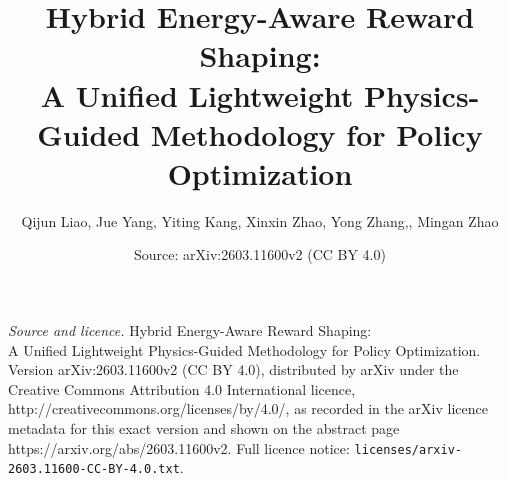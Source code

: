 \documentclass[10pt,a4paper]{amsart}
\title{Hybrid Energy-Aware Reward Shaping:\\A Unified Lightweight Physics-Guided Methodology for Policy Optimization}
\author{Qijun Liao, Jue Yang, Yiting Kang, Xinxin Zhao, Yong Zhang,, Mingan Zhao}
\date{Source: arXiv:2603.11600v2 (CC BY 4.0)}
\begin{document}
\maketitle

\noindent\emph{Source and licence.} Hybrid Energy-Aware Reward Shaping:\\A Unified Lightweight Physics-Guided Methodology for Policy Optimization. Version arXiv:2603.11600v2 (CC BY 4.0), distributed by arXiv under the Creative Commons Attribution 4.0 International licence, http://creativecommons.org/licenses/by/4.0/, as recorded in the arXiv licence metadata for this exact version and shown on the abstract page https://arxiv.org/abs/2603.11600v2. Full licence notice: \texttt{licenses/arxiv-2603.11600-CC-BY-4.0.txt}.\par\smallskip
\end{document}
